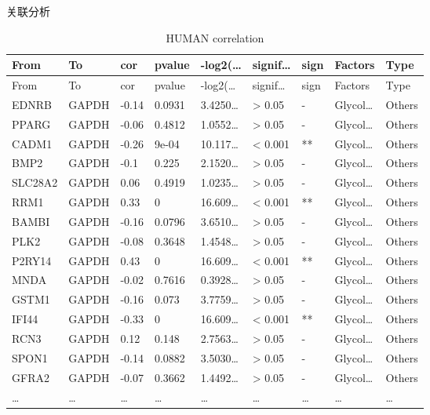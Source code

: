\documentclass[
  ignorenonframetext,
]{beamer}
\begin{document}
\begin{frame}[fragile]{关联分析}
\begin{longtable}[]{@{}lllllllll@{}}
\caption{HUMAN correlation}\tabularnewline
\toprule
From & To & cor & pvalue & -log2(\ldots{} & signif\ldots{} & sign &
Factors & Type\tabularnewline
\midrule
\endfirsthead
\toprule
From & To & cor & pvalue & -log2(\ldots{} & signif\ldots{} & sign &
Factors & Type\tabularnewline
\midrule
\endhead
EDNRB & GAPDH & -0.14 & 0.0931 & 3.4250\ldots{} & \textgreater{} 0.05 &
- & Glycol\ldots{} & Others\tabularnewline
PPARG & GAPDH & -0.06 & 0.4812 & 1.0552\ldots{} & \textgreater{} 0.05 &
- & Glycol\ldots{} & Others\tabularnewline
CADM1 & GAPDH & -0.26 & 9e-04 & 10.117\ldots{} & \textless{} 0.001 & **
& Glycol\ldots{} & Others\tabularnewline
BMP2 & GAPDH & -0.1 & 0.225 & 2.1520\ldots{} & \textgreater{} 0.05 & - &
Glycol\ldots{} & Others\tabularnewline
SLC28A2 & GAPDH & 0.06 & 0.4919 & 1.0235\ldots{} & \textgreater{} 0.05 &
- & Glycol\ldots{} & Others\tabularnewline
RRM1 & GAPDH & 0.33 & 0 & 16.609\ldots{} & \textless{} 0.001 & ** &
Glycol\ldots{} & Others\tabularnewline
BAMBI & GAPDH & -0.16 & 0.0796 & 3.6510\ldots{} & \textgreater{} 0.05 &
- & Glycol\ldots{} & Others\tabularnewline
PLK2 & GAPDH & -0.08 & 0.3648 & 1.4548\ldots{} & \textgreater{} 0.05 & -
& Glycol\ldots{} & Others\tabularnewline
P2RY14 & GAPDH & 0.43 & 0 & 16.609\ldots{} & \textless{} 0.001 & ** &
Glycol\ldots{} & Others\tabularnewline
MNDA & GAPDH & -0.02 & 0.7616 & 0.3928\ldots{} & \textgreater{} 0.05 & -
& Glycol\ldots{} & Others\tabularnewline
GSTM1 & GAPDH & -0.16 & 0.073 & 3.7759\ldots{} & \textgreater{} 0.05 & -
& Glycol\ldots{} & Others\tabularnewline
IFI44 & GAPDH & -0.33 & 0 & 16.609\ldots{} & \textless{} 0.001 & ** &
Glycol\ldots{} & Others\tabularnewline
RCN3 & GAPDH & 0.12 & 0.148 & 2.7563\ldots{} & \textgreater{} 0.05 & - &
Glycol\ldots{} & Others\tabularnewline
SPON1 & GAPDH & -0.14 & 0.0882 & 3.5030\ldots{} & \textgreater{} 0.05 &
- & Glycol\ldots{} & Others\tabularnewline
GFRA2 & GAPDH & -0.07 & 0.3662 & 1.4492\ldots{} & \textgreater{} 0.05 &
- & Glycol\ldots{} & Others\tabularnewline
\ldots{} & \ldots{} & \ldots{} & \ldots{} & \ldots{} & \ldots{} &
\ldots{} & \ldots{} & \ldots{}\tabularnewline
\bottomrule
\end{longtable}

\begin{center}\vspace{1.5cm}\end{center}
\end{frame}
\end{document}
